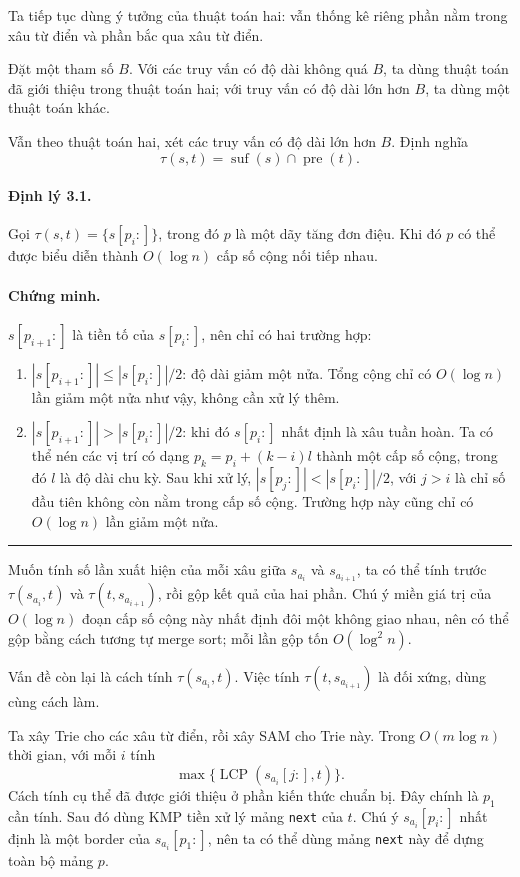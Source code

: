 \documentclass[11pt]{article}
\newcommand{\qedmark}{\hfill\rule{0.7ex}{0.7ex}}
\begin{document}
Ta tiếp tục dùng ý tưởng của thuật toán hai: vẫn thống kê riêng phần nằm trong
xâu từ điển và phần bắc qua xâu từ điển.

Đặt một tham số \(B\). Với các truy vấn có độ dài không quá \(B\), ta dùng thuật
toán đã giới thiệu trong thuật toán hai; với truy vấn có độ dài lớn hơn \(B\),
ta dùng một thuật toán khác.

Vẫn theo thuật toán hai, xét các truy vấn có độ dài lớn hơn \(B\). Định nghĩa
\[
  \tau(s,t)=\operatorname{suf}(s)\cap\operatorname{pre}(t).
\]

\paragraph{Định lý 3.1.}
Gọi \(\tau(s,t)=\{s[p_i:]\}\), trong đó \(p\) là một dãy tăng đơn điệu. Khi đó
\(p\) có thể được biểu diễn thành \(O(\log n)\) cấp số cộng nối tiếp nhau.

\paragraph{Chứng minh.}
\(s[p_{i+1}:]\) là tiền tố của \(s[p_i:]\), nên chỉ có hai trường hợp:
\begin{enumerate}
  \item \(|s[p_{i+1}:]|\le |s[p_i:]|/2\): độ dài giảm một nửa. Tổng cộng chỉ
  có \(O(\log n)\) lần giảm một nửa như vậy, không cần xử lý thêm.
  \item \(|s[p_{i+1}:]|>|s[p_i:]|/2\): khi đó \(s[p_i:]\) nhất định là xâu
  tuần hoàn. Ta có thể nén các vị trí có dạng
  \(p_k=p_i+(k-i)l\) thành một cấp số cộng, trong đó \(l\) là độ dài chu kỳ.
  Sau khi xử lý, \(|s[p_j:]|<|s[p_i:]|/2\), với \(j>i\) là chỉ số đầu tiên
  không còn nằm trong cấp số cộng. Trường hợp này cũng chỉ có \(O(\log n)\)
  lần giảm một nửa.
\end{enumerate}
\qedmark

Muốn tính số lần xuất hiện của mỗi xâu giữa \(s_{a_i}\) và \(s_{a_{i+1}}\), ta
có thể tính trước \(\tau(s_{a_i},t)\) và \(\tau(t,s_{a_{i+1}})\), rồi gộp kết
quả của hai phần. Chú ý miền giá trị của \(O(\log n)\) đoạn cấp số cộng này
nhất định đôi một không giao nhau, nên có thể gộp bằng cách tương tự merge sort;
mỗi lần gộp tốn \(O(\log^2 n)\).

Vấn đề còn lại là cách tính \(\tau(s_{a_i},t)\). Việc tính
\(\tau(t,s_{a_{i+1}})\) là đối xứng, dùng cùng cách làm.

Ta xây Trie cho các xâu từ điển, rồi xây SAM cho Trie này. Trong
\(O(m\log n)\) thời gian, với mỗi \(i\) tính
\[
  \max\{\operatorname{LCP}(s_{a_i}[j:],t)\}.
\]
Cách tính cụ thể đã được giới thiệu ở phần kiến thức chuẩn bị. Đây chính là
\(p_1\) cần tính. Sau đó dùng KMP tiền xử lý mảng \texttt{next} của \(t\). Chú
ý \(s_{a_i}[p_i:]\) nhất định là một border của \(s_{a_i}[p_1:]\), nên ta có
thể dùng mảng \texttt{next} này để dựng toàn bộ mảng \(p\).
\end{document}
